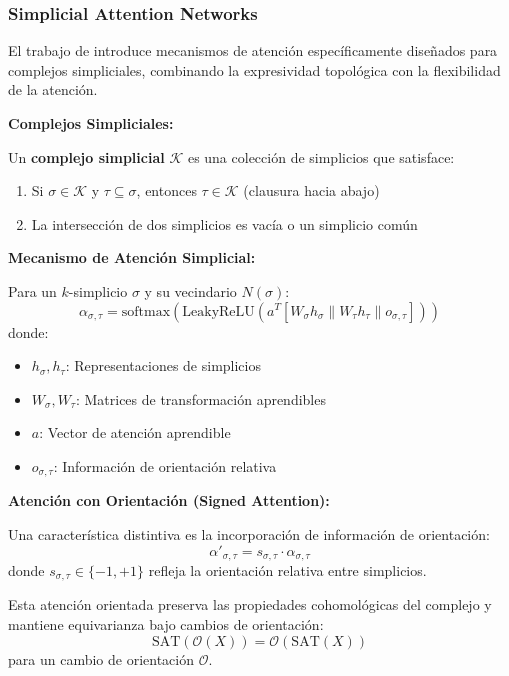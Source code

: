 \subsubsection{Simplicial Attention Networks}

El trabajo de \citet{giusti2022simplicial} introduce mecanismos de atención específicamente diseñados para complejos simpliciales, combinando la expresividad topológica con la flexibilidad de la atención.

\textbf{Complejos Simpliciales:}

\begin{definition}
Un \textbf{complejo simplicial} $\mathcal{K}$ es una colección de simplicios que satisface:
\begin{enumerate}
    \item Si $\sigma \in \mathcal{K}$ y $\tau \subseteq \sigma$, entonces $\tau \in \mathcal{K}$ (clausura hacia abajo)
    \item La intersección de dos simplicios es vacía o un simplicio común
\end{enumerate}
\end{definition}

\textbf{Mecanismo de Atención Simplicial:}

Para un $k$-simplicio $\sigma$ y su vecindario $N(\sigma)$:
\[\alpha_{\sigma,\tau} = \text{softmax}\left(\text{LeakyReLU}\left(a^T[W_\sigma h_\sigma \| W_\tau h_\tau \| o_{\sigma,\tau}]\right)\right)\]
donde:
\begin{itemize}
    \item $h_\sigma, h_\tau$: Representaciones de simplicios
    \item $W_\sigma, W_\tau$: Matrices de transformación aprendibles
    \item $a$: Vector de atención aprendible
    \item $o_{\sigma,\tau}$: Información de orientación relativa
\end{itemize}

\textbf{Atención con Orientación (Signed Attention):}

Una característica distintiva es la incorporación de información de orientación:
\[\alpha'_{\sigma,\tau} = s_{\sigma,\tau} \cdot \alpha_{\sigma,\tau}\]
donde $s_{\sigma,\tau} \in \{-1, +1\}$ refleja la orientación relativa entre simplicios.

Esta atención orientada preserva las propiedades cohomológicas del complejo y mantiene equivarianza bajo cambios de orientación:
\[\text{SAT}(\mathcal{O}(X)) = \mathcal{O}(\text{SAT}(X))\]
para un cambio de orientación $\mathcal{O}$.

